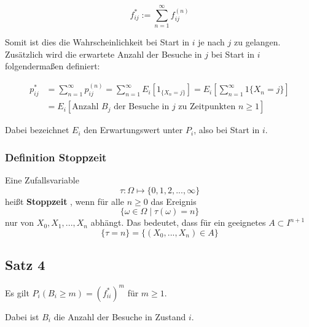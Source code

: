 \documentclass[a4paper]{article}
\begin{document}
\[
f_{ij} ^{*} := \sum_{n=1}^{\infty} f_{ij} ^{(n)}
\] 

Somit ist dies die Wahrscheinlichkeit bei Start in $i$ je nach $j$ zu gelangen.
\\

Zusätzlich wird die erwartete Anzahl der Besuche in $j$ bei Start in $i$ folgendermaßen definiert:

\begin{align*}
	p_{ij} ^{*} &=
	\sum_{n=1}^{\infty} p_{ij} ^{(n)} 
				= \sum_{n=1}^{\infty} E_i \left[
		1_{\{
				X_n = j
		\}}  
	\right] 
			  = E_i \left[
				  \sum_{n=1}^{\infty} 1\{
				  	X_n = j
				  \} 
			  \right]  \\
			  &= E_i \left[
				  \text{Anzahl $B_j$ der Besuche in $j$ zu Zeitpunkten $n \geq 1$}
			  \right] 
\end{align*}

Dabei bezeichnet $E_i$ den Erwartungswert unter $P_i$, also bei Start in $i$.

\subsubsection{Definition Stoppzeit}
Eine Zufallsvariable 
\[
\tau : \Omega \mapsto \{
	0, 1, 2, ..., \infty
\} 
\] 
heißt \textbf{Stoppzeit} , wenn für alle $n \geq 0$ das Ereignis 
\[
\{
	\omega \in \Omega \; \vert \; \tau (\omega) = n
\} 
\] 
nur von $X_0, X_1 ,...,X_n$ abhängt. Das bedeutet, 
dass für ein geeignetes $A \subset I ^{n+1}$
\[
\{
	\tau = n
\} = \{
	\left(
		X_0, ..., X_n
	\right) \in A
\}
\] 

\subsection{Satz 4}

Es gilt $P_i(B_i \geq m) = \left(
	f_{ii} ^{*}
\right) ^{m}$ für $m \geq 1$.

Dabei ist $B_i$ die Anzahl der Besuche in Zustand $i$.
\end{document}
